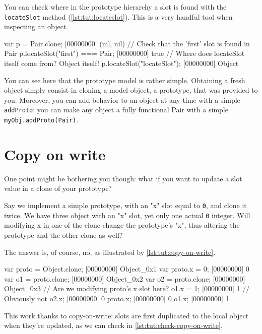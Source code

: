 You can check where in the prototype hierarchy a slot is found with
the \lstinline{locateSlot} method (\autoref{lst:tut:locateslot}). This is a very
handful tool when inspecting an object.

\begin{urbiscript}[caption=Using locateSlot, label=lst:tut:locateslot]
var p = Pair.clone;
[00000000] (nil, nil)
// Check that the 'first' slot is found in Pair
p.locateSlot("first") === Pair;
[00000000] true
// Where does locateSlot itself come from? Object itself!
p.locateSlot("locateSlot");
[00000000] Object
\end{urbiscript}

You can see here that the prototype model is rather simple. Obtaining
a fresh object simply consist in cloning a model object, a prototype,
that was provided to you. Moreover, you can add behavior to an object
at any time with a simple \lstinline{addProto}: you can make any object a
fully functional Pair with a simple \lstinline|myObj.addProto(Pair)|.

\section{Copy on write}

One point might be bothering you though: what if you want to update a
slot value in a clone of your prototype?

Say we implement a simple prototype, with an "x" slot equal to
\lstinline|0|, and clone it twice. We have three object with an "x"
slot, yet only one actual \lstinline|0| integer. Will modifying x in
one of the clone change the prototype's "x", thus altering the
prototype and the other clone as well?

The answer is, of course, no, as illustrated by \autoref{lst:tut:copy-on-write}.

\begin{urbiscript}[caption=Copy on write in action,
  label=lst:tut:copy-on-write, name=cow]
var proto = Object.clone;
[00000000] Object_0x1
var proto.x = 0;
[00000000] 0
var o1 = proto.clone;
[00000000] Object_0x2
var o2 = proto.clone;
[00000000] Object_0x3
// Are we modifying proto's x slot here?
o1.x = 1;
[00000000] 1
// Obviously not
o2.x;
[00000000] 0
proto.x;
[00000000] 0
o1.x;
[00000000] 1
\end{urbiscript}

This work thanks to copy-on-write: slots are first duplicated to the
local object when they're updated, as we can check in
\autoref{lst:tut:check-copy-on-write}.

